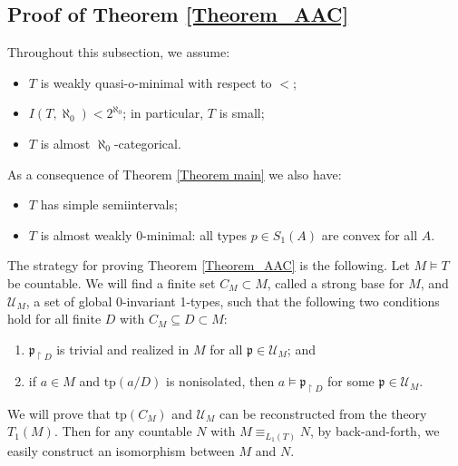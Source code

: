 \documentclass{amsart}
\theoremstyle{definition}
\theoremstyle{definition}
\def\strok{\restriction}
\newcommand{\tp}{\mathrm{tp}}
\begin{document}
 \subsection{Proof of Theorem \ref{Theorem_AAC}}

Throughout this subsection, we assume: 
\begin{itemize}
    \item $T$ is weakly quasi-o-minimal with respect to $<$;
    \item $I(T,\aleph_0)<2^{\aleph_0}$; in particular, $T$ is small;
    \item $T$ is almost $\aleph_0$-categorical.
\end{itemize}
As a consequence of Theorem \ref{Theorem main} we also have:
\begin{itemize}
    \item $T$ has simple semiintervals;
    \item $T$ is almost weakly 0-minimal: all types $p\in S_1(A)$ are convex for all $A$.
\end{itemize}


The strategy for proving Theorem \ref{Theorem_AAC} is the following. Let $M\models T$ be countable. We will find a finite set $C_M\subset M$, called a strong base for $M$, and $\mathcal U_M$, a set of global $0$-invariant 1-types, such that the following two conditions hold for all finite $D$ with $C_M\subseteq D\subset M$:
\begin{enumerate}[label=--]
\item $\mathfrak p_{\strok D}$ is trivial and realized in $M$ for all $\mathfrak p\in\mathcal U_M$; and 
\item if $a\in M$ and $\tp(a/D)$ is nonisolated, then $a\models \mathfrak p_{\strok D}$ for some $\mathfrak p\in\mathcal U_M$.
\end{enumerate}
We will prove that $\tp(C_M)$ and $\mathcal U_M$ can be reconstructed from the theory $T_1(M)$. Then for any countable $N$ with $M\equiv_{L_1(T)}N$, by back-and-forth, we easily construct an isomorphism between $M$ and $N$. 

 
\end{document}
